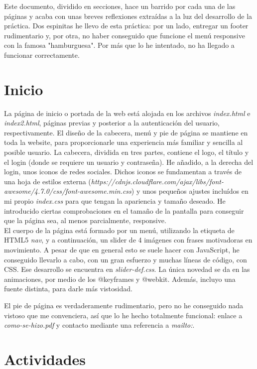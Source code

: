 Este documento, dividido en secciones, hace un barrido por cada una de las páginas y acaba con unas breves reflexiones extraídas a la luz del desarrollo de la práctica. Dos espinitas he llevo de esta práctica: por un lado, entregar un footer rudimentario y, por otra, no haber conseguido que funcione el menú responsive con la famosa "hamburguesa". Por más que lo he intentado, no ha llegado a funcionar correctamente.
 
\section{Inicio}

La página de inicio o portada de la web está alojada en los archivos \textit{index.html} e \textit{index2.html}, páginas previas y posterior a la autenticación del usuario, respectivamente. El diseño de la cabecera, menú y pie de página se mantiene en toda la website, para proporcionarle una experiencia más familiar y sencilla al posible usuario. La cabecera, dividida en tres partes, contiene el logo, el título y el login (donde se requiere un usuario y contraseña). He añadido, a la derecha del login, unos iconos de redes sociales. Dichos iconos se fundamentan a través de una hoja de estilos externa (\textit{https://cdnjs.cloudflare.com/ajax/libs/font-awesome/4.7.0/css/font-awesome.min.css}) y unos pequeños ajustes incluídos en mi propio \textit{index.css} para que tengan la apariencia y tamaño deseado. He introducido ciertas comprobaciones en el tamaño de la pantalla para conseguir que la página sea, al menos parcialmente, responsive. \\

El cuerpo de la página está formado por un menú, utilizando la etiqueta de HTML5 \textit{nav}, y a continuación, un slider de 4 imágenes con frases motivadoras en movimiento. A pesar de que en general esto se suele hacer con JavaScript, he conseguido llevarlo a cabo, con un gran esfuerzo y muchas líneas de código, con CSS. Ese desarrollo se encuentra en \textit{slider-def.css}. La única novedad se da en las animaciones, por medio de los @keyframes y @webkit. Además, incluyo una fuente distinta, para darle más vistosidad.

El pie de página es verdaderamente rudimentario, pero no he conseguido nada vistoso que me convenciera, así que lo he hecho totalmente funcional: enlace a \textit{como-se-hizo.pdf} y contacto mediante una referencia a \textit{mailto:}.

\section{Actividades}

